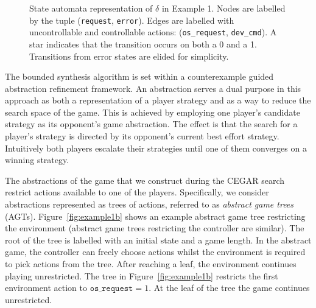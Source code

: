 \begin{figure}[b]
    \centering
    \caption[State automata representation of example $\delta$.]{State automata representation of $\delta$ in Example 1. Nodes are labelled by the tuple (\texttt{request}, \texttt{error}). Edges are labelled with uncontrollable and controllable actions: (\texttt{os\_request}, \texttt{dev\_cmd}). A star indicates that the transition occurs on both a 0 and a 1. Transitions from error states are elided for simplicity.}
    \label{fig:example1}
\end{figure}

The bounded synthesis algorithm is set within a counterexample guided abstraction refinement framework. An abstraction serves a dual purpose in this approach as both a representation of a player strategy and as a way to reduce the search space of the game. This is achieved by employing one player's candidate strategy as its opponent's game abstraction. The effect is that the search for a player's strategy is directed by its opponent's current best effort strategy. Intuitively both players escalate their strategies until one of them converges on a winning strategy.

The abstractions of the game that we construct during the CEGAR search restrict actions available to one of the players.  Specifically, we consider abstractions represented as trees of actions, referred to as \emph{abstract game trees} (AGTs).  Figure~\ref{fig:example1b} shows an example abstract game tree restricting the environment (abstract game trees restricting the controller are similar).  The root of the tree is labelled with an initial state and a game length.  In the abstract game, the controller can freely choose actions whilst the environment is required to pick actions from the tree.  After reaching a leaf, the environment continues playing unrestricted.  The tree in Figure~\ref{fig:example1b} restricts the first environment action to $\texttt{os\_request} = 1$. At the leaf of the tree the game continues unrestricted.

